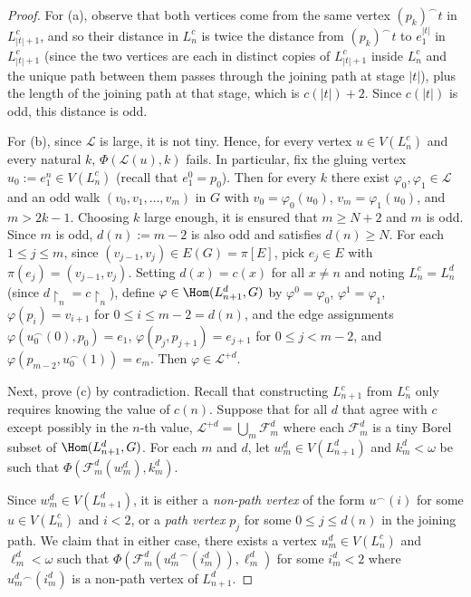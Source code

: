 \begin{proof}
    For (a), observe that both vertices come from the same vertex $(p_k)^\smallfrown t$ in $L^c_{|t|+1}$, and so their distance in $L^c_n$ is twice the distance from $(p_k)^\smallfrown t$ to $e_1^{|t|}$ in $L^c_{|t|+1}$ (since the two vertices are each in distinct copies of $L^c_{|t|+1}$ inside $L^c_n$ and the unique path between them passes through the joining path at stage $|t|$), plus the length of the joining path at that stage, which is $c(|t|)+2$.
    Since $c(|t|)$ is odd, this distance is odd.

    For (b), since $\mathcal L$ is large, it is not tiny.
    Hence, for every vertex $u\in V(L^c_n)$ and every natural $k$, $\Phi(\mathcal L(u),k)$ fails.
    In particular, fix the gluing vertex $u_0:=e_1^n\in V(L^c_n)$ (recall that $e_1^0=p_0$).
    Then for every $k$ there exist $\varphi_0,\varphi_1\in\mathcal L$ and an odd walk $(v_0,v_1,\dots,v_m)$ in $G$ with $v_0=\varphi_0(u_0)$, $v_m=\varphi_1(u_0)$, and $m>2k-1$.
    Choosing $k$ large enough, it is ensured that $m\geq N+2$ and $m$ is odd.
    Since $m$ is odd, $d(n):=m-2$ is also odd and satisfies $d(n)\geq N$.
    For each $1\leq j\leq m$, since $(v_{j-1},v_j)\in E(G)=\pi[E]$, pick $e_j\in E$ with $\pi(e_j)=(v_{j-1},v_j)$.
    Setting $d(x)=c(x)$ for all $x\neq n$ and noting $L^c_n=L^d_n$ (since $d\restriction_n=c\restriction_n$), define $\varphi\in\Hom(L_{n+1}^d,G)$ by $\varphi^0=\varphi_0$, $\varphi^1=\varphi_1$, $\varphi(p_i)=v_{i+1}$ for $0\leq i\leq m-2=d(n)$, and the edge assignments $\varphi(u_0^\frown (0),p_0)=e_1$, $\varphi(p_j,p_{j+1})=e_{j+1}$ for $0\leq j<m-2$, and $\varphi(p_{m-2},u_0^\frown (1))=e_m$.
    Then $\varphi\in\mathcal L^{+d}$.

    Next, prove (c) by contradiction.
    Recall that constructing $L^c_{n+1}$ from $L^c_n$ only requires knowing the value of $c(n)$.
    Suppose that for all $d$ that agree with $c$ except possibly in the $n$-th value, $\mathcal L^{+d}=\bigcup_m\mathcal F^d_m$ where each $\mathcal F^d_m$ is a tiny Borel subset of $\Hom(L^d_{n+1},G)$.
    For each $m$ and $d$, let $w^d_m\in V(L^d_{n+1})$ and $k^d_m<\omega$ be such that $\Phi(\mathcal F^d_m(w^d_m),k^d_m)$.
    
    Since $w^d_m\in V(L^d_{n+1})$, it is either a \emph{non-path vertex} of the form $u^\smallfrown(i)$ for some $u\in V(L^c_n)$ and $i<2$, or a \emph{path vertex} $p_j$ for some $0\leq j\leq d(n)$ in the joining path.
    We claim that in either case, there exists a vertex $u^d_m\in V(L^c_n)$ and $\ell^d_m<\omega$ such that $\Phi(\mathcal F^d_m({u^d_m}^\smallfrown(i^d_m)),\ell^d_m)$ for some $i^d_m<2$ where $u^d_m{}^\smallfrown(i^d_m)$ is a non-path vertex of $L^d_{n+1}$.


\end{proof}
